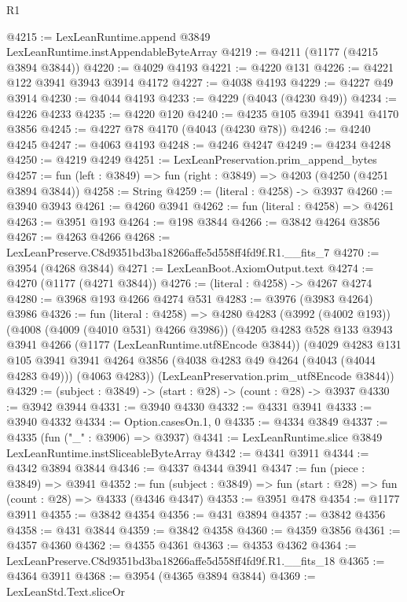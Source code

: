 \begin{lexlean}{R1}
\begin{coremodule}
@4215 := LexLeanRuntime.append @3849 LexLeanRuntime.instAppendableByteArray
@4219 := @4211 (@1177 (@4215 @3894 @3844))
@4220 := @4029 @4193
@4221 := @4220 @131
@4226 := @4221 @122 @3941 @3943 @3914 @4172
@4227 := @4038 @4193
@4229 := @4227 @49 @3914
@4230 := @4044 @4193
@4233 := @4229 (@4043 (@4230 @49))
@4234 := @4226 @4233
@4235 := @4220 @120
@4240 := @4235 @105 @3941 @3941 @4170 @3856
@4245 := @4227 @78 @4170 (@4043 (@4230 @78))
@4246 := @4240 @4245
@4247 := @4063 @4193
@4248 := @4246 @4247
@4249 := @4234 @4248
@4250 := @4219 @4249
@4251 := LexLeanPreservation.prim_append_bytes
@4257 := fun (left : @3849) => fun (right : @3849) => @4203 (@4250 (@4251 @3894 @3844))
@4258 := String
@4259 := (literal : @4258) -> @3937
@4260 := @3940 @3943
@4261 := @4260 @3941
@4262 := fun (literal : @4258) => @4261
@4263 := @3951 @193
@4264 := @198 @3844
@4266 := @3842 @4264 @3856
@4267 := @4263 @4266
@4268 := LexLeanPreserve.C8d9351bd3ba18266affe5d558ff4fd9f.R1.__fits_7
@4270 := @3954 (@4268 @3844)
@4271 := LexLeanBoot.AxiomOutput.text
@4274 := @4270 (@1177 (@4271 @3844))
@4276 := (literal : @4258) -> @4267 @4274
@4280 := @3968 @193 @4266 @4274 @531
@4283 := @3976 (@3983 @4264) @3986
@4326 := fun (literal : @4258) =>
  @4280
    @4283
    (@3992 (@4002 @193))
    (@4008 (@4009 (@4010 @531) @4266 @3986))
    (@4205
      @4283
      @528
      @133
      @3943
      @3941
      @4266
      (@1177 (LexLeanRuntime.utf8Encode @3844))
      (@4029
        @4283
        @131
        @105
        @3941
        @3941
        @4264
        @3856
        (@4038 @4283 @49 @4264 (@4043 (@4044 @4283 @49)))
        (@4063 @4283))
      (LexLeanPreservation.prim_utf8Encode @3844))
@4329 := (subject : @3849) -> (start : @28) -> (count : @28) -> @3937
@4330 := @3942 @3944
@4331 := @3940 @4330
@4332 := @4331 @3941
@4333 := @3940 @4332
@4334 := Option.casesOn.{1, 0}
@4335 := @4334 @3849
@4337 := @4335 (fun ("_" : @3906) => @3937)
@4341 := LexLeanRuntime.slice @3849 LexLeanRuntime.instSliceableByteArray
@4342 := @4341 @3911
@4344 := @4342 @3894 @3844
@4346 := @4337 @4344 @3941
@4347 := fun (piece : @3849) => @3941
@4352 := fun (subject : @3849) => fun (start : @28) => fun (count : @28) => @4333 (@4346 @4347)
@4353 := @3951 @478
@4354 := @1177 @3911
@4355 := @3842 @4354
@4356 := @431 @3894
@4357 := @3842 @4356
@4358 := @431 @3844
@4359 := @3842 @4358
@4360 := @4359 @3856
@4361 := @4357 @4360
@4362 := @4355 @4361
@4363 := @4353 @4362
@4364 := LexLeanPreserve.C8d9351bd3ba18266affe5d558ff4fd9f.R1.__fits_18
@4365 := @4364 @3911
@4368 := @3954 (@4365 @3894 @3844)
@4369 := LexLeanStd.Text.sliceOr

\end{coremodule}
\end{lexlean}
